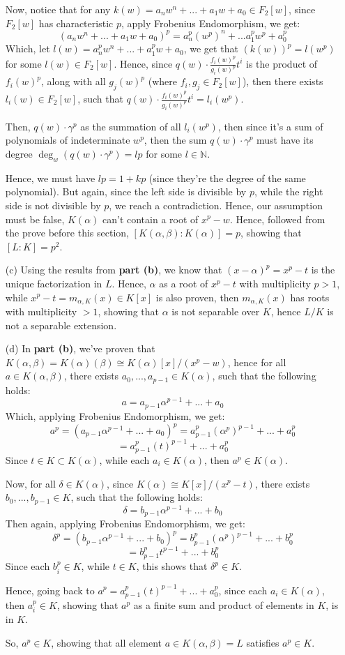 \documentclass{article}
\begin{document}
\begin{itemize}
    Now, notice that for any $k(w)=a_nw^n+...+a_1w+a_0\in F_2[w]$, since $F_2[w]$ has characteristic $p$, apply Frobenius Endomorphism, we get:
    $$(a_nw^n+...+a_1w+a_0)^p = a_n^p(w^p)^n+...a_1^pw^p+a_0^p$$
    Which, let $l(w)=a_n^pw^n+...+a_1^pw+a_0$, we get that $(k(w))^p = l(w^p)$ for some $l(w)\in F_2[w]$.  Hence, since $q(w)\cdot \frac{f_i(w)^p}{g_i(w)^p}t^i$ is the product of $f_i(w)^p$, along with all $g_j(w)^p$ (where $f_i,g_j\in F_2[w]$), then there exists $l_i(w)\in F_2[w]$, such that $q(w)\cdot \frac{f_i(w)^p}{g_i(w)^p}t^i = l_i(w^p)$.

    Then, $q(w)\cdot \gamma^p$ as the summation of all $l_i(w^p)$, then since it's a sum of polynomials of indeterminate $w^p$, then the sum $q(w)\cdot \gamma^p$ must have its degree $\deg_w(q(w)\cdot \gamma^p) = lp$ for some $l\in\mathbb{N}$.

    Hence, we must have $lp = 1+kp$ (since they're the degree of the same polynomial). But again, since the left side is divisible by $p$, while the right side is not divisible by $p$, we reach a contradiction.
    Hence, our assumption must be false, $K(\alpha)$ can't contain a root of $x^p-w$. Hence, followed from the prove before this section, $[K(\alpha,\beta):K(\alpha)] = p$,
    showing that $[L:K]=p^2$.

    \hfil
    
    \item[(c)] Using the results from \textbf{part (b)}, we know that $(x-\alpha)^p = x^p-t$ is the unique factorization in $L$. Hence, $\alpha$ as a root of $x^p-t$ with multiplicity $p>1$, while $x^p-t=m_{\alpha,K}(x)\in K[x]$ is also proven, then $m_{\alpha,K}(x)$ has roots with multiplicity $>1$, showing that $\alpha$ is not separable over $K$, hence $L/K$ is not a separable extension.

    \hfil

    \item[(d)] In \textbf{part (b)}, we've proven that $K(\alpha,\beta)=K(\alpha)(\beta) \cong K(\alpha)[x]/(x^p-w)$, hence for all $a\in K(\alpha,\beta)$, there exists $a_0,...,a_{p-1}\in K(\alpha)$, such that the following holds:
    $$a = a_{p-1}\alpha^{p-1}+...+a_0$$
    Which, applying Frobenius Endomorphism, we get:
    $$a^p = (a_{p-1}\alpha^{p-1}+...+a_0)^p = a_{p-1}^p(\alpha^p)^{p-1}+...+a_0^p$$
    $$ = a_{p-1}^p(t)^{p-1}+...+a_0^p$$
    Since $t\in K\subset K(\alpha)$, while each $a_i\in K(\alpha)$, then $a^p\in K(\alpha)$.

    Now, for all $\delta\in K(\alpha)$, since $K(\alpha)\cong K[x]/(x^p-t)$, there exists $b_0,...,b_{p-1}\in K$, such that the following holds:
    $$\delta = b_{p-1}\alpha^{p-1}+...+b_0$$
    Then again, applying Frobenius Endomorphism, we get:
    $$\delta^p = (b_{p-1}\alpha^{p-1}+...+b_0)^p = b_{p-1}^p(\alpha^p)^{p-1}+...+b_0^p$$
    $$ = b_{p-1}^pt^{p-1}+...+b_0^p$$
    Since each $b_i^p \in K$, while $t\in K$, this shows that $\delta^p \in K$.

    Hence, going back to $a^p = a_{p-1}^p(t)^{p-1}+...+a_0^p$, since each $a_i\in K(\alpha)$, then $a_i^p\in K$, showing that $a^p$ as a finite sum and product of elements in $K$, is in $K$.

    So, $a^p\in K$, showing that all element $a\in K(\alpha,\beta)=L$ satisfies $a^p\in K$.
\end{itemize}
\end{document}
